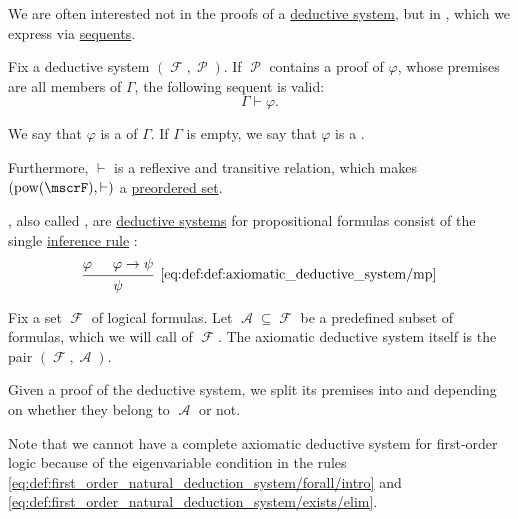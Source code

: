 \begin{definition}\label{def:proof_derivability}\mimprovised
  We are often interested not in the proofs of a \hyperref[def:deductive_system]{deductive system}, but in , which we express via \hyperref[def:judgment/sequent]{sequents}.

  Fix a deductive system \( (\mscrF, \mscrP) \). If \( \mscrP \) contains a proof of \( \varphi \), whose premises are all members of \( \Gamma \), the following sequent is valid:
  \begin{equation*}
    \Gamma \vdash \varphi.
  \end{equation*}

  We say that \( \varphi \) is a  of \( \Gamma \). If \( \Gamma \) is empty, we say that \( \varphi \) is a .

  Furthermore, \( \vdash \) is a reflexive and transitive relation, which makes \( (\pow(\mscrF), \vdash) \) a \hyperref[def:preordered_set]{preordered set}.
\end{definition}

\begin{definition}\label{def:axiomatic_deductive_system}\mimprovised
  , also called , are \hyperref[def:deductive_system]{deductive systems} for propositional formulas consist of the single \hyperref[def:judgment/inference_rule]{inference rule} :
  \begin{equation*}\taglabel[\textrm{MP}]{eq:def:def:axiomatic_deductive_system/mp}
    \begin{prooftree}
      \hypo{ \varphi }
      \hypo{ \varphi \rightarrow \psi }
      \infer2[\ref{eq:def:def:axiomatic_deductive_system/mp}]{ \psi }
    \end{prooftree}
  \end{equation*}

  Fix a set \( \mscrF \) of logical formulas. Let \( \mscrA \subseteq \mscrF \) be a predefined subset of formulas, which we will call  of \( \mscrF \). The axiomatic deductive system itself is the pair \( (\mscrF, \mscrA) \).

  Given a proof of the deductive system, we split its premises into  and  depending on whether they belong to \( \mscrA \) or not.

  Note that we cannot have a complete axiomatic deductive system for first-order logic because of the eigenvariable condition in the rules \eqref{eq:def:first_order_natural_deduction_system/forall/intro} and \eqref{eq:def:first_order_natural_deduction_system/exists/elim}.
\end{definition}

